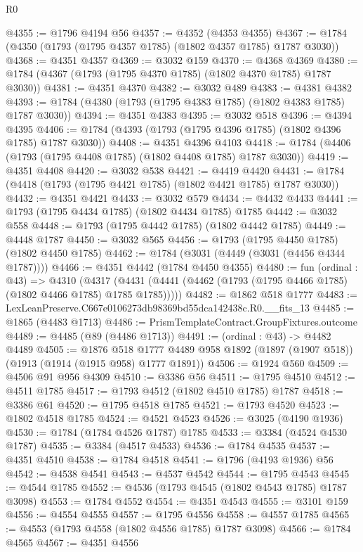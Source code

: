 \begin{lexlean}{R0}
\begin{coremodule}
@4355 := @1796 @4194 @56
@4357 := @4352 (@4353 @4355)
@4367 := @1784 (@4350 (@1793 (@1795 @4357 @1785) (@1802 @4357 @1785) @1787 @3030))
@4368 := @4351 @4357
@4369 := @3032 @159
@4370 := @4368 @4369
@4380 := @1784 (@4367 (@1793 (@1795 @4370 @1785) (@1802 @4370 @1785) @1787 @3030))
@4381 := @4351 @4370
@4382 := @3032 @489
@4383 := @4381 @4382
@4393 := @1784 (@4380 (@1793 (@1795 @4383 @1785) (@1802 @4383 @1785) @1787 @3030))
@4394 := @4351 @4383
@4395 := @3032 @518
@4396 := @4394 @4395
@4406 := @1784 (@4393 (@1793 (@1795 @4396 @1785) (@1802 @4396 @1785) @1787 @3030))
@4408 := @4351 @4396 @4103
@4418 := @1784 (@4406 (@1793 (@1795 @4408 @1785) (@1802 @4408 @1785) @1787 @3030))
@4419 := @4351 @4408
@4420 := @3032 @538
@4421 := @4419 @4420
@4431 := @1784 (@4418 (@1793 (@1795 @4421 @1785) (@1802 @4421 @1785) @1787 @3030))
@4432 := @4351 @4421
@4433 := @3032 @579
@4434 := @4432 @4433
@4441 := @1793 (@1795 @4434 @1785) (@1802 @4434 @1785) @1785
@4442 := @3032 @558
@4448 := @1793 (@1795 @4442 @1785) (@1802 @4442 @1785)
@4449 := @4448 @1787
@4450 := @3032 @565
@4456 := @1793 (@1795 @4450 @1785) (@1802 @4450 @1785)
@4462 := @1784 (@3031 (@4449 (@3031 (@4456 @4344 @1787))))
@4466 := @4351 @4442 (@1784 @4450 @4355)
@4480 := fun (ordinal : @43) =>
  @4310 (@4317 (@4431 (@4441 (@4462 (@1793 (@1795 @4466 @1785) (@1802 @4466 @1785) @1785 @1785)))))
@4482 := @1862 @518 @1777
@4483 := LexLeanPreserve.C667e0106273db98369bd55dca142438c.R0.__fits_13
@4485 := @1865 (@4483 @1713)
@4486 := PrismTemplateContract.GroupFixtures.outcome
@4489 := @4485 (@89 (@4486 @1713))
@4491 := (ordinal : @43) -> @4482 @4489
@4505 := @1876
    @518
    @1777
    @4489
    @958
    @1892
    (@1897 (@1907 @518))
    (@1913 (@1914 (@1915 @958) @1777 @1891))
@4506 := @1924 @560
@4509 := @4506 @91 @956 @4309
@4510 := @3386 @56
@4511 := @1795 @4510
@4512 := @4511 @1785
@4517 := @1793 @4512 (@1802 @4510 @1785) @1787
@4518 := @3386 @61
@4520 := @1795 @4518 @1785
@4521 := @1793 @4520
@4523 := @1802 @4518 @1785
@4524 := @4521 @4523
@4526 := @3025 (@4190 @1936)
@4530 := @1784 (@1784 @4526 @1787) @1785
@4533 := @3384 (@4524 @4530 @1787)
@4535 := @3384 (@4517 @4533)
@4536 := @1784 @4535
@4537 := @4351 @4510
@4538 := @1784 @4518
@4541 := @1796 (@4193 @1936) @56
@4542 := @4538 @4541
@4543 := @4537 @4542
@4544 := @1795 @4543
@4545 := @4544 @1785
@4552 := @4536 (@1793 @4545 (@1802 @4543 @1785) @1787 @3098)
@4553 := @1784 @4552
@4554 := @4351 @4543
@4555 := @3101 @159
@4556 := @4554 @4555
@4557 := @1795 @4556
@4558 := @4557 @1785
@4565 := @4553 (@1793 @4558 (@1802 @4556 @1785) @1787 @3098)
@4566 := @1784 @4565
@4567 := @4351 @4556

\end{coremodule}
\end{lexlean}
